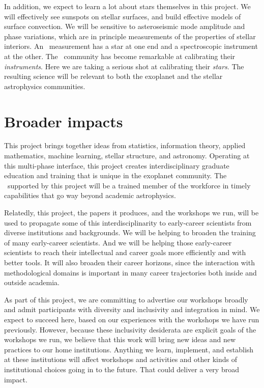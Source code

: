 \documentclass[12pt, letterpaper]{article}
\begin{document}
In addition, we expect to learn a lot about stars themselves in this project.
We will effectively see sunspots on stellar surfaces, and build effective models
of surface convection.
We will be sensitive to asteroseismic mode amplitude and phase variations, which
are in principle measurements of the properties of stellar interiors.
An \EPRV\ measurement has a star at one end and a spectroscopic instrument at the other.
The \EPRV\ community has become remarkable at calibrating their \emph{instruments}.
Here we are taking a serious shot at calibrating their \emph{stars}. 
The resulting science will be relevant to both the exoplanet and the stellar astrophysics 
communities.

\section{Broader impacts}

This project brings together ideas from statistics, information theory, applied mathematics, machine learning, stellar structure, and astronomy.
Operating at this multi-phase interface, this project creates interdisciplinary graduate education and training that is unique in the exoplanet community.
The \GRA\ supported by this project will be a trained member of the  workforce in timely capabilities that go way beyond academic astrophysics.

Relatedly, this project, the papers it produces, and the workshops we run, will be used to propagate some of this interdisciplinarity to early-career scientists from diverse institutions and backgrounds.
We will be helping to broaden the training of many early-career scientists.
And we will be helping those early-career scientists to reach their intellectual and career goals more efficiently and with better tools.
It will also broaden their career horizons, since the interaction with methodological domains is important in many career trajectories both inside and outside academia.

As part of this project, we are committing to advertise our workshops broadly and admit participants with diversity and inclusivity and integration in mind. 
We expect to succeed here, based on our experiences with the workshops we have run previously.
However, because these inclusivity desiderata are explicit goals of the workshops we run, we believe that this work will bring new ideas and new practices to our home institutions.
Anything we learn, implement, and establish at these institutions will affect workshops and activities and other kinds of institutional choices going in to the future.
That could deliver a very broad impact.
\end{document}
